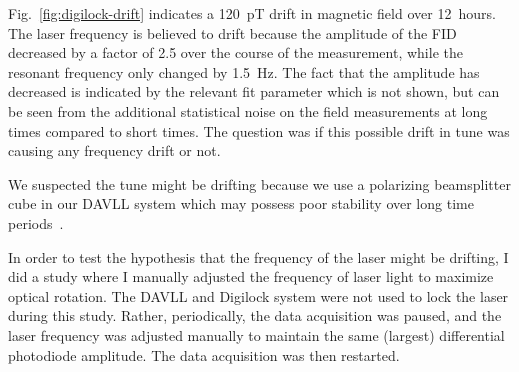 Fig.~\ref{fig:digilock-drift} indicates a 120~pT drift in magnetic
field over 12~hours.  The laser frequency is believed to drift because
the amplitude of the FID decreased by a factor of 2.5 over the course
of the measurement, while the resonant frequency only changed by
1.5~Hz.  The fact that the amplitude has decreased is indicated by the
relevant fit parameter which is not shown, but can be seen from the
additional statistical noise on the field measurements at long times
compared to short times.  The question was if this possible drift in
tune was causing any frequency drift or not.

We suspected the tune might be drifting because we use a polarizing
beamsplitter cube in our DAVLL system which may possess poor stability
over long time periods~\cite{bib:Philip2008}.

In order to test the hypothesis that the frequency of the laser might
be drifting, I did a study where I manually adjusted the frequency of
laser light to maximize optical rotation.  The DAVLL and Digilock
system were not used to lock the laser during this study.  Rather,
periodically, the data acquisition was paused, and the laser frequency
was adjusted manually to maintain the same (largest) differential
photodiode amplitude. The data acquisition was then restarted.

